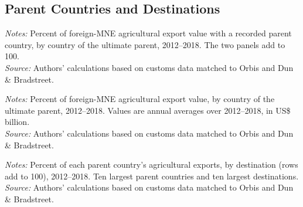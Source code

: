 \documentclass[11pt,a4paper]{article}
\newcommand{\srcnote}{\textit{Source:} Authors' calculations based on customs data matched to Orbis and Dun \& Bradstreet.}
\begin{document}
\subsection{Parent Countries and Destinations}
\begin{table}[H]\centering\small%
  \caption{Foreign-Multinational Agricultural Exports, by Parent Country: Other Countries and Tax Havens}%
  \label{tab:ap_panels}%
  \par\vspace{3pt}%
  \begin{minipage}{0.95\textwidth}\footnotesize %
  \textit{Notes:} Percent of foreign-MNE agricultural export value with a recorded parent country, by country of the ultimate parent, 2012--2018. The two panels add to 100.\\[3pt]%
  \srcnote%
  \end{minipage}%
  \end{table}
\begin{table}[H]\centering\small%
  \caption{Foreign-Multinational Agricultural Exports, by Parent Country}%
  \label{tab:ap_f4n}%
  \par\vspace{3pt}%
  \begin{minipage}{0.95\textwidth}\footnotesize %
  \textit{Notes:} Percent of foreign-MNE agricultural export value, by country of the ultimate parent, 2012--2018. Values are annual averages over 2012--2018, in US\$ billion.\\[3pt]%
  \srcnote%
  \end{minipage}%
  \end{table}
\begin{table}[H]\centering\small%
  \caption{Destination of Foreign-Multinational Agricultural Exports, by Parent Country}%
  \label{tab:ap_pxd}%
  \par\vspace{3pt}%
  \begin{minipage}{0.95\textwidth}\footnotesize %
  \textit{Notes:} Percent of each parent country's agricultural exports, by destination (rows add to 100), 2012--2018. Ten largest parent countries and ten largest destinations.\\[3pt]%
  \srcnote%
  \end{minipage}%
  \end{table}
\end{document}
